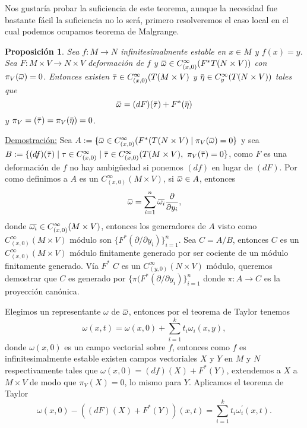 \documentclass{report}
\newtheorem{prop}[theorem]{Proposici\'on}
\theoremstyle{definition}
\newcommand{\overbar}[1]{\mkern 1.5mu\overline{\mkern-1.5mu#1\mkern-1.5mu}\mkern 1.5mu}
\begin{document}
Nos gustar\'ia probar la suficiencia de este teorema, aunque la necesidad fue bastante f\'acil la suficiencia no lo ser\'a, primero resolveremos el caso local en el cual podemos ocupamos teorema de Malgrange.

\begin{prop}
Sea $f: M \to N$ infinitesimalmente estable en $x \in M$ y $f(x)=y$. Sea $F: M \times V \to N \times V$ deformaci\'on de $f$ y $\overbar{\omega} \in C^\infty_{(x,0)} (F^\ast T(N \times V))$ con $\pi_V (\overbar{\omega}) = 0$. Entonces existen $\overbar{\tau} \in C^\infty_{(x,0)} (T(M \times V)$ y $\overbar{\eta} \in C^\infty_y (T(N \times V))$ tales que $$\overbar{\omega} =  (dF)(\overbar{\tau}) + F^\ast (\overbar{\eta})$$ y $\pi_V = (\overbar{\tau}) = \pi_V( \overbar{\eta}) = 0$.


\end{prop}

\underline{Demostraci\'on:} Sea $ A := \{ \overbar{\omega} \in C^\infty_{(x,0)} (F^\ast (T(N \times V) \mid \pi_V (\overbar{\omega} ) = 0 \}$ y sea $B := \{ (df)(\overbar{\tau}) \mid \tau \in C^\infty_{(x,0)} \mid \overbar{\tau} \in C^\infty_{(x,0)} (T(M \times V) , \text{  } \pi_V(\overbar{\tau}) = 0 \}$, como $F$ es una deformaci\'on de $f$ no hay ambigüedad si ponemos $(df)$ en lugar de $(dF)$. Por como definimos a $A$ es un $C^\infty_{(x,0)} (M \times V)$, si $\overbar{\omega} \in A$, entonces $$\overbar{\omega} = \sum\limits_{i=1}^n \overbar{\omega_i} \frac{\partial}{\partial y_i} ,$$ donde $\overbar{\omega_i} \in C^\infty_{(x,0)}(M \times V)$, entonces los generadores de $A$ visto como \\ $C^\infty_{(x,0)} (M \times V)$ m\'odulo son $\{ F^\ast (\partial / \partial y_i ) \}_{i=1}^n$. Sea $C= A/B$, entonces $C$ es un $C^\infty_{(x,0)} (M \times V)$ m\'odulo finitamente generado por ser cociente de un m\'odulo finitamente generado. V\'ia $F^\ast$ $C$ es un $C^\infty_{(y,0)} (N \times V)$ m\'odulo, queremos demostrar que $C$ es generado por $\{ \pi (F^\ast ( \partial /\partial y_i) \}_{i=1}^n$ donde $\pi:A \to C $ es la proyecci\'on can\'onica.

Elegimos un representante $\omega$ de $\overbar{\omega}$, entonces por el teorema de Taylor tenemos $$\omega (x,t) = \omega(x,0) + \sum\limits_{i=1}^k t_i \omega_i (x,y) ,$$ donde $\omega(x,0) $ es un campo vectorial sobre $f$, entonces como $f$ es infinitesimalmente estable existen campos vectoriales $X$ y $Y$ en $M$ y $N$ respectivamente tales que $\omega (x,0) = (df)(X) + F^\ast (Y)$, extendemos a $X$ a $M \times V$ de modo que $\pi_V (X)=0$, lo mismo para $Y$. Aplicamos el teorema de Taylor $$\omega (x,0) - ((dF) (X) + F^\ast (Y))(x,t) = \sum\limits_{i=1}^k t_i \omega_i^\prime (x,t) .$$
\end{document}
